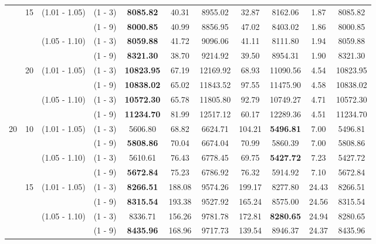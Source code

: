 \documentclass[a4paper,11pt]{article}
\begin{document}
\begin{table}[!ht]
\begin{tabular}{|c|c|c|c|c|c|c|c|c|c|c|}
 & 15 & (1.01 - 1.05) & (1 - 3)  &  \textbf{8085.82}  &  40.31      &  8955.02  &  32.87      &  8162.06  &  1.87      &  8085.82 \\
 &  &  & (1 - 9)  &  \textbf{8000.85}  &  40.99      &  8856.95  &  47.02      &  8403.02  &  1.86      &  8000.85 \\
 &  & (1.05 - 1.10) & (1 - 3)  &  \textbf{8059.88}  &  41.72      &  9096.06  &  41.11      &  8111.80  &  1.94      &  8059.88 \\
 &  &  & (1 - 9)  &  \textbf{8321.30}  &  38.70      &  9214.92  &  39.50      &  8954.31  &  1.90      &  8321.30 \\
 & 20 & (1.01 - 1.05) & (1 - 3)  &  \textbf{10823.95}  &  67.19      &  12169.92  &  68.93      &  11090.56  &  4.54      &  10823.95 \\
 &  &  & (1 - 9)  &  \textbf{10838.02}  &  65.02      &  11843.52  &  97.55      &  11475.90  &  4.58      &  10838.02 \\
 &  & (1.05 - 1.10) & (1 - 3)  &  \textbf{10572.30}  &  65.78      &  11805.80  &  92.79      &  10749.27  &  4.71      &  10572.30 \\
 &  & & (1 - 9)  &  \textbf{11234.70}  &  81.99      &  12517.12  &  60.17      &  12289.36  &  4.51      &  11234.70 \\
20 & 10 & (1.01 - 1.05) & (1 - 3)  &  5606.80  &  68.82      &  6624.71  &  104.21      &  \textbf{5496.81}  &  7.00      &  5496.81 \\
 &  &  & (1 - 9)  &  \textbf{5808.86}  &  70.04      &  6674.04  &  70.99      &  5860.39  &  7.00      &  5808.86  \\
 &  & (1.05 - 1.10) & (1 - 3)  &  5610.61  &  76.43      &  6778.45  &  69.75      &  \textbf{5427.72}  &  7.23      &  5427.72  \\
 &  &  & (1 - 9)  &  \textbf{5672.84}  &  75.23      &  6786.92  &  76.32      &  5914.92  &  7.10      &  5672.84  \\
 & 15 & (1.01 - 1.05) & (1 - 3)  &  \textbf{8266.51}  &  188.08      &  9574.26  &  199.17      &  8277.80  &  24.43      &  8266.51 \\ 
 &  &  & (1 - 9)  &  \textbf{8315.54}  &  193.38      &  9527.92  &  165.24      &  8575.00  &  24.56      &  8315.54 \\
 &  & (1.05 - 1.10) & (1 - 3)  &  8336.71  &  156.26      &  9781.78  &  172.81      &  \textbf{8280.65} &  24.94      &  8280.65 \\
 &  &  & (1 - 9)  &  \textbf{8435.96}  &  168.96      &  9717.73  &  139.54      &  8946.37  &  24.37      &  8435.96 \\

\end{tabular}
\end{table}
\end{document}
